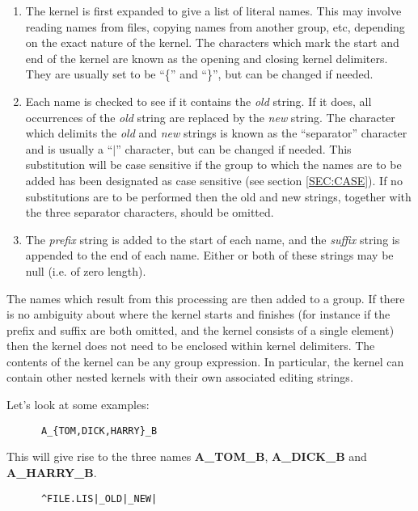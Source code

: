 \begin{enumerate}

\item The kernel is first expanded to give a list of literal names. This may
involve reading names from files, copying names from another group, etc,
depending on the exact nature of the kernel. The characters which mark the start
and end of the kernel are known as the opening and closing kernel delimiters.
They are usually set to be ``\{'' and ``\}'', but can be changed if needed.

\item Each name is checked to see if it contains the {\em old} string. If it
does, all occurrences of the {\em old} string are replaced by the {\em new}
string. The character which delimits the {\em old} and {\em new} strings is
known as the ``separator'' character and is usually a ``$\mid$'' character,
but can be
changed if needed. This substitution will be case sensitive if the group to
which the names are to be added has been designated as case sensitive (see
section \ref{SEC:CASE}). If no substitutions are to be performed then the old
and new strings, together with the three separator characters, should be
omitted.

\item The {\em prefix} string is added to the start of each name, and the {\em
suffix} string is appended to the end of each name. Either or both of these
strings may be null (i.e. of zero length).

\end{enumerate}

The names which result from this processing are then added to a group. If there
is no ambiguity about where the kernel starts and finishes (for instance if the
prefix and suffix are both omitted, and the kernel consists of a single element)
then the kernel does not need to be enclosed within kernel delimiters. The
contents of the kernel can be any group expression. In particular, the kernel
can contain other nested kernels with their own associated editing strings.

Let's look at some examples:

\small
\begin{verbatim}
      A_{TOM,DICK,HARRY}_B
\end{verbatim}
\normalsize

This will give rise to the three names {\bf A\_TOM\_B}, {\bf A\_DICK\_B} and
{\bf A\_HARRY\_B}.

\small
\begin{verbatim}
      ^FILE.LIS|_OLD|_NEW|
\end{verbatim}
\normalsize

